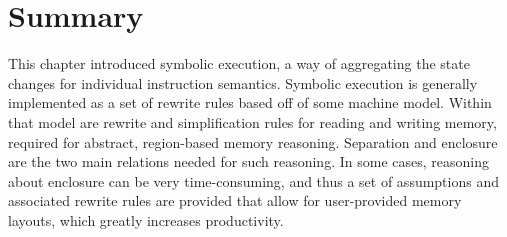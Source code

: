 \section{Summary}
This chapter introduced symbolic execution,
a way of aggregating the state changes for individual instruction semantics.
Symbolic execution is generally implemented as a set of rewrite rules
based off of some machine model.
Within that model are rewrite and simplification rules
for reading and writing memory,
required for abstract, region-based memory reasoning.
Separation and enclosure are the two main relations needed for such reasoning.
In some cases, reasoning about enclosure can be very time-consuming,
and thus a set of assumptions and associated rewrite rules are provided
that allow for user-provided memory layouts, which greatly increases productivity.
